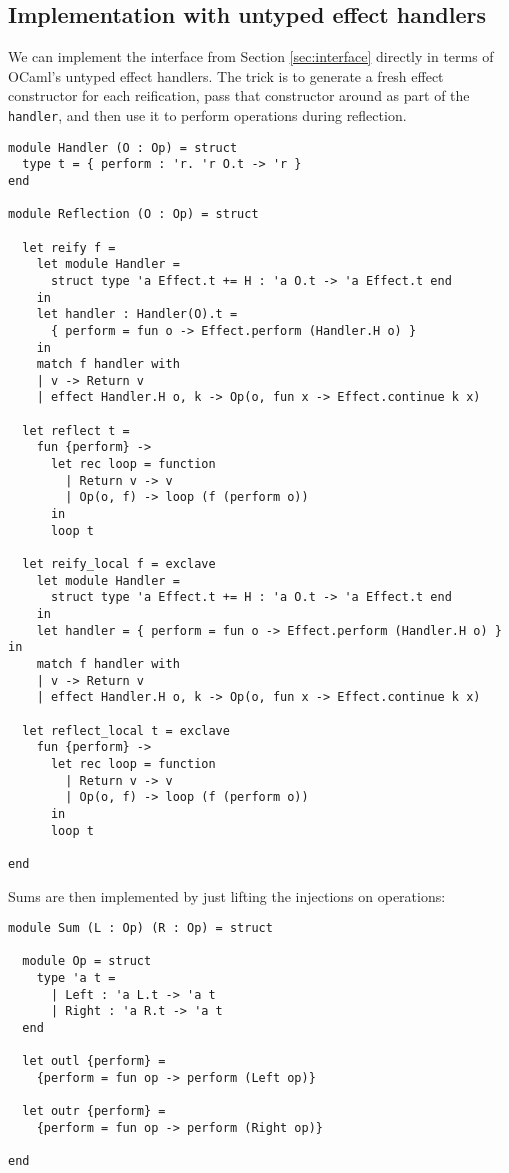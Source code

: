 \documentclass[acmsmall, screen, nonacm]{acmart}
\theoremstyle{definition}
\begin{document}
\subsection{Implementation with untyped effect handlers}

We can implement the interface from Section \ref{sec:interface} directly
in terms of OCaml's untyped effect
handlers\cite{Sivaramakrishnan2021retrofitting}. The trick is to
generate a fresh effect constructor for each reification, pass that
constructor around as part of the \lstinline[style=ocaml]{handler}, and
then use it to perform operations during reflection.

\begin{lstlisting}[style=ocaml]
module Handler (O : Op) = struct
  type t = { perform : 'r. 'r O.t -> 'r }
end

module Reflection (O : Op) = struct

  let reify f =
    let module Handler =
      struct type 'a Effect.t += H : 'a O.t -> 'a Effect.t end
    in
    let handler : Handler(O).t =
      { perform = fun o -> Effect.perform (Handler.H o) }
    in
    match f handler with
    | v -> Return v
    | effect Handler.H o, k -> Op(o, fun x -> Effect.continue k x)

  let reflect t =
    fun {perform} ->
      let rec loop = function
        | Return v -> v
        | Op(o, f) -> loop (f (perform o))
      in
      loop t

  let reify_local f = exclave
    let module Handler =
      struct type 'a Effect.t += H : 'a O.t -> 'a Effect.t end
    in
    let handler = { perform = fun o -> Effect.perform (Handler.H o) } in
    match f handler with
    | v -> Return v
    | effect Handler.H o, k -> Op(o, fun x -> Effect.continue k x)

  let reflect_local t = exclave
    fun {perform} ->
      let rec loop = function
        | Return v -> v
        | Op(o, f) -> loop (f (perform o))
      in
      loop t

end
\end{lstlisting}
Sums are then implemented by just lifting the injections on operations:
\begin{lstlisting}[style=ocaml]
module Sum (L : Op) (R : Op) = struct

  module Op = struct
    type 'a t =
      | Left : 'a L.t -> 'a t
      | Right : 'a R.t -> 'a t
  end    

  let outl {perform} =
    {perform = fun op -> perform (Left op)}

  let outr {perform} =
    {perform = fun op -> perform (Right op)}

end
\end{lstlisting}
\end{document}
